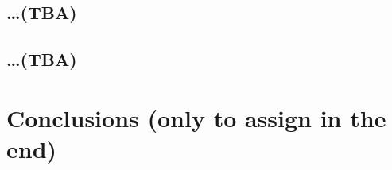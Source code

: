 \documentclass[
graybox,
envcountchap,
]{svmult}
\begin{document}
\begin{bibunit}
        \subsection{\ldots (TBA)}

        \subsection{\ldots (TBA)}


        \section{Conclusions (only to assign in the end)}\label{sec:2}

	
	
	
	
	


\end{bibunit}
\end{document}
